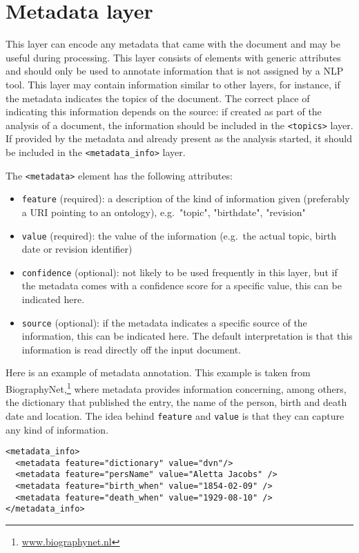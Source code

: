 
\section{Metadata layer}
\label{sec:metadata-layer}

This layer can encode any metadata that came with the document and may be useful during processing. This layer consists of elements with generic attributes and should only be used to annotate information that is not assigned by a NLP tool. This layer may contain information similar to other layers, for instance, if the metadata indicates the topics of the document. The correct place of indicating this information depends on the source: if created as part of the analysis of a document, the information should be included in the \texttt{<topics>} layer. If provided by the metadata and already present as the analysis started, it should be included in the \texttt{<metadata\_info>} layer. 

The \texttt{<metadata>} element has the following attributes:
\begin{itemize}
\item \texttt{feature} (required): a description of the kind of information given (preferably a URI pointing to an ontology), e.g.\ "topic", "birthdate", "revision"
\item \texttt{value} (required): the value of the information (e.g.\ the actual topic, birth date or revision identifier)
\item \texttt{confidence} (optional): not likely to be used frequently in this layer, but if the metadata comes with a confidence score for a specific value, this can be indicated here.
\item \texttt{source} (optional): if the metadata indicates a specific source of the information, this can be indicated here. The default interpretation is that this information is read directly off the input document.
\end{itemize}

Here is an example of metadata annotation. This example is taken from BiographyNet,\footnote{\url{www.biographynet.nl}} where metadata provides information concerning, among others, the dictionary that published the entry, the name of the person, birth and death date and location. The idea behind \texttt{feature} and \texttt{value} is that they can capture any kind of information.

\begin{Verbatim}
<metadata_info>
  <metadata feature="dictionary" value="dvn"/>
  <metadata feature="persName" value="Aletta Jacobs" />
  <metadata feature="birth_when" value="1854-02-09" />
  <metadata feature="death_when" value="1929-08-10" />
</metadata_info>
\end{Verbatim}


